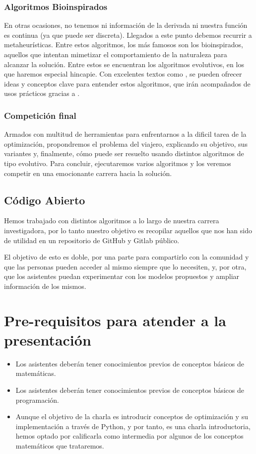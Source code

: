 \documentclass[runningheads]{llncs}
\begin{document}
\subsubsection{Algoritmos Bioinspirados}
En otras ocasiones, no tenemos ni información de la derivada ni nuestra función es continua (ya que puede ser discreta). Llegados a este punto debemos recurrir a metaheurísticas. Entre estos algoritmos, los más famosos son los bioinspirados, aquellos que intentan mimetizar el comportamiento de la naturaleza para alcanzar la solución. Entre estos se encuentran los algoritmos evolutivos, en los que haremos especial hincapie. Con excelentes textos como \cite{brownlee2011clever}, se pueden ofrecer ideas y conceptos clave para entender estos algoritmos, que irán acompañados de usos prácticos gracias a \cite{aarongarrett-inspyred}.
\subsubsection{Competición final}
Armados con multitud de herramientas para enfrentarnos a la dificil tarea de la optimización, propondremos el problema del viajero, explicando su objetivo, sus variantes y, finalmente, cómo puede ser resuelto usando distintos algoritmos de tipo evolutivo. Para concluir, ejecutaremos varios algoritmos y los veremos competir en una emocionante carrera hacia la solución.

\subsection{Código Abierto}

Hemos trabajado con distintos algoritmos a lo largo de nuestra carrera investigadora, por lo tanto nuestro objetivo es recopilar aquellos que nos han sido de utilidad en un repositorio de GitHub y Gitlab público.

El objetivo de esto es doble, por una parte para compartirlo con la comunidad y que las personas pueden acceder al mismo siempre que lo necesiten, y, por otra, que los asistentes puedan experimentar con los modelos propuestos y ampliar información de los mismos.

\section{Pre-requisitos para atender a la presentación}
\begin{itemize}
\item  Los asistentes deber\'an tener conocimientos previos de conceptos básicos de matemáticas. 
\item Los asistentes deber\'an tener conocimientos previos de conceptos básicos de programación. 
\item Aunque el objetivo de la charla es introducir conceptos de optimización y su implementación a través de Python, y por tanto, es una charla introductoria, hemos optado por calificarla como intermedia por algunos de los conceptos matemáticos que trataremos.
\end{itemize}
\end{document}
